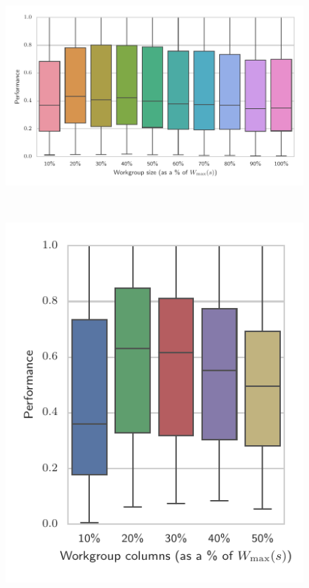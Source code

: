 \begin{subfigure}[h]{\textwidth}
\centering
\includegraphics{img/performance_max_wgsize}
\vspace{-1.5em} %
\caption{}
\label{fig:performance-max-wgsize}
\end{subfigure}
\\
\begin{subfigure}[h]{.48\textwidth}
\centering
\includegraphics{img/performance_max_c}
\vspace{-1.5em} %
\caption{}
\label{fig:performance-wg-c}
\end{subfigure}
